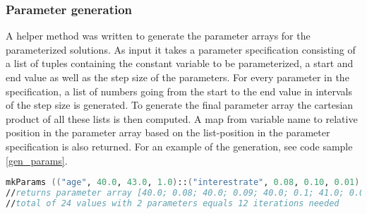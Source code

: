 \begin{table}[h!]
\centering
{}
\caption{CalcSpec generated F\# Alea.cuBase calculations per ms with double precision and parameters\label{table:cubaseGeneratedParamdoubletime}}
\end{table}

\subsubsection{Parameter generation}
A helper method was written to generate the parameter arrays for the parameterized solutions.
As input it takes a parameter specification consisting of a list of tuples containing the constant variable to be parameterized, a start and end value as well as the step size of the parameters.
For every parameter in the specification, a list of numbers going from the start to the end value in intervals of the step size is generated.
To generate the final parameter array the cartesian product of all these lists is then computed.
A map from variable name to relative position in the parameter array based on the list-position in the parameter specification is also returned.
For an example of the generation, see code sample \ref{gen_params}.

\begin{lstlisting}[language=fsharp, caption=Parameter generation with the age variable ranging from 40 to 43 and the interest rate variable ranging from 8\% to 10\%, label=gen_params]
mkParams (("age", 40.0, 43.0, 1.0)::("interestrate", 0.08, 0.10, 0.01)::[]);;
//returns parameter array [40.0; 0.08; 40.0; 0.09; 40.0; 0.1; 41.0; 0.08; 41.0; 0.09; 41.0; 0.1; 42.0; 0.08; 42.0; 0.09; 42.0; 0.1; 43.0; 0.08; 43.0; 0.09; 43.0; 0.1]
//total of 24 values with 2 parameters equals 12 iterations needed
\end{lstlisting}

